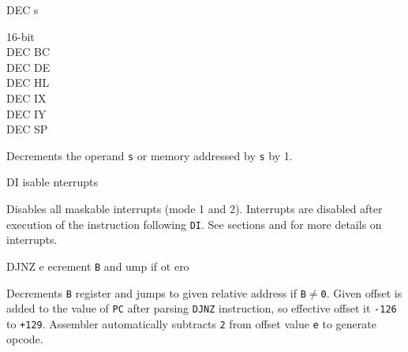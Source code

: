 \begin{basedescript}{
	\desclabelstyle{\multilinelabel}
	\desclabelwidth{3cm}}
\begin{DetailItem}{DEC s}
\begin{DetailVariants}
			\columnbreak
			\textnormal{16-bit}\\
			DEC BC\\
			DEC DE\\
			DEC HL\\
			DEC IX\\
			DEC IY\\
			DEC SP
		\end{DetailVariants}

		Decrements the operand {\tt s} or memory addressed by {\tt s} by 1.

		\begin{DetailEffects}[v]
			\FlagsDECr[8-bit]
		\end{DetailEffects}
		
		\begin{DetailTiming}
		\end{DetailTiming}

	\end{DetailItem}

	\pagebreak
	\begin{DetailItem}{DI}
		{isable nterrupts}
		{\SymDI}

		Disables all maskable interrupts (mode 1 and 2). Interrupts are disabled after execution of the instruction following {\tt DI}. See sections  and  for more details on interrupts.
		
		\begin{DetailEffects}
			\FlagsDI
		\end{DetailEffects}
				
		\begin{DetailTiming}
			\DetailTime{1}{4}
		\end{DetailTiming}

	\end{DetailItem}

	\begin{DetailItem}{DJNZ e}
		{ecrement {\tt B} and ump if ot \IH{Z}ero}
		{\SymDJNZ{e}}

		Decrements {\tt B} register and jumps to given relative address if {\tt B$\neq$0}. Given offset is added to the value of {\tt PC} after parsing {\tt DJNZ} instruction, so effective offset it {\tt -126} to {\tt +129}. Assembler automatically subtracts {\tt 2} from offset value {\tt e} to generate opcode.


\end{DetailItem}
\end{basedescript}
